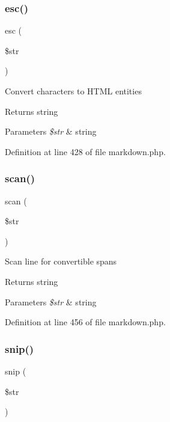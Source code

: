 \subsubsection{\texorpdfstring{esc()}{esc()}}
{\footnotesize\ttfamily esc (\begin{DoxyParamCaption}\item[{}]{\$str }\end{DoxyParamCaption})}

Convert characters to H\+T\+ML entities \begin{DoxyReturn}{Returns}
string 
\end{DoxyReturn}

\begin{DoxyParams}{Parameters}
{\em \$str} & string \\
\hline
\end{DoxyParams}


Definition at line 428 of file markdown.\+php.

\hypertarget{class_markdown_a13c88b9c8e8002dfc54d002e47baf4fc}{}\label{class_markdown_a13c88b9c8e8002dfc54d002e47baf4fc} 
\subsubsection{\texorpdfstring{scan()}{scan()}}
{\footnotesize\ttfamily scan (\begin{DoxyParamCaption}\item[{}]{\$str }\end{DoxyParamCaption})}

Scan line for convertible spans \begin{DoxyReturn}{Returns}
string 
\end{DoxyReturn}

\begin{DoxyParams}{Parameters}
{\em \$str} & string \\
\hline
\end{DoxyParams}


Definition at line 456 of file markdown.\+php.

\hypertarget{class_markdown_aa662980c0756e03123234999df984f02}{}\label{class_markdown_aa662980c0756e03123234999df984f02} 
\subsubsection{\texorpdfstring{snip()}{snip()}}
{\footnotesize\ttfamily snip (\begin{DoxyParamCaption}\item[{}]{\$str }\end{DoxyParamCaption})\hspace{0.3cm}{\ttfamily [protected]}}

